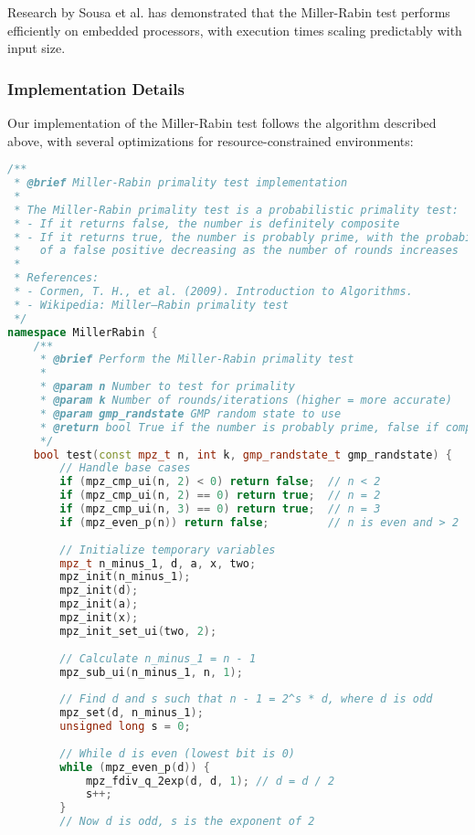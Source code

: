 Research by Sousa et al. \cite{taxonomy_primality} has demonstrated that the Miller-Rabin test performs efficiently on embedded processors, with execution times scaling predictably with input size.

\subsubsection{Implementation Details}

Our implementation of the Miller-Rabin test follows the algorithm described above, with several optimizations for resource-constrained environments:

\begin{lstlisting}[language=C++, caption=Miller-Rabin Primality Test Implementation]
/**
 * @brief Miller-Rabin primality test implementation
 * 
 * The Miller-Rabin primality test is a probabilistic primality test: 
 * - If it returns false, the number is definitely composite
 * - If it returns true, the number is probably prime, with the probability
 *   of a false positive decreasing as the number of rounds increases
 * 
 * References:
 * - Cormen, T. H., et al. (2009). Introduction to Algorithms.
 * - Wikipedia: Miller–Rabin primality test
 */
namespace MillerRabin {
    /**
     * @brief Perform the Miller-Rabin primality test
     * 
     * @param n Number to test for primality
     * @param k Number of rounds/iterations (higher = more accurate)
     * @param gmp_randstate GMP random state to use
     * @return bool True if the number is probably prime, false if composite
     */
    bool test(const mpz_t n, int k, gmp_randstate_t gmp_randstate) {
        // Handle base cases
        if (mpz_cmp_ui(n, 2) < 0) return false;  // n < 2
        if (mpz_cmp_ui(n, 2) == 0) return true;  // n = 2
        if (mpz_cmp_ui(n, 3) == 0) return true;  // n = 3
        if (mpz_even_p(n)) return false;         // n is even and > 2
        
        // Initialize temporary variables
        mpz_t n_minus_1, d, a, x, two;
        mpz_init(n_minus_1);
        mpz_init(d);
        mpz_init(a);
        mpz_init(x);
        mpz_init_set_ui(two, 2);
        
        // Calculate n_minus_1 = n - 1
        mpz_sub_ui(n_minus_1, n, 1);
        
        // Find d and s such that n - 1 = 2^s * d, where d is odd
        mpz_set(d, n_minus_1);
        unsigned long s = 0;
        
        // While d is even (lowest bit is 0)
        while (mpz_even_p(d)) {
            mpz_fdiv_q_2exp(d, d, 1); // d = d / 2
            s++;
        }
        // Now d is odd, s is the exponent of 2
        

\end{lstlisting}
